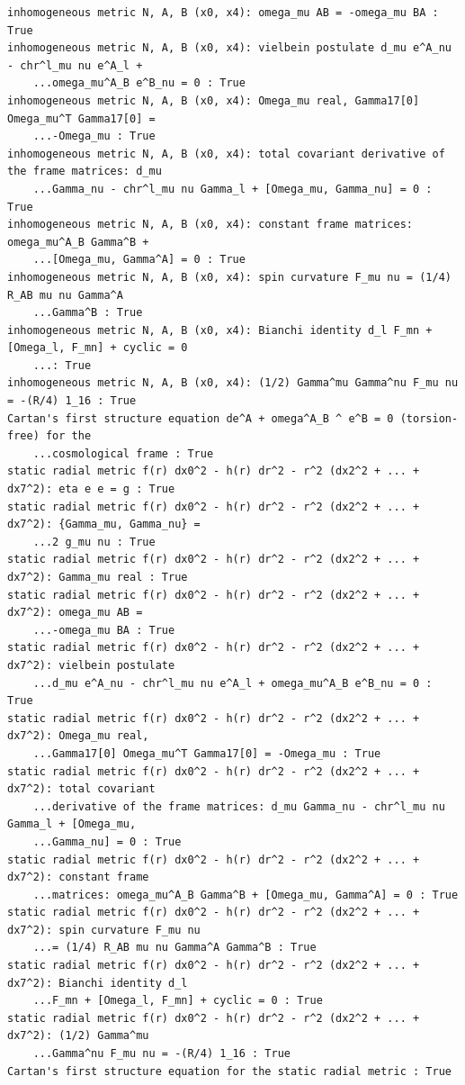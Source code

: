 \documentclass[10pt,a4paper]{article}
\begin{document}
\begin{Verbatim}[fontsize=\small,frame=single,framesep=2mm]
inhomogeneous metric N, A, B (x0, x4): omega_mu AB = -omega_mu BA : True
inhomogeneous metric N, A, B (x0, x4): vielbein postulate d_mu e^A_nu - chr^l_mu nu e^A_l +
    ...omega_mu^A_B e^B_nu = 0 : True
inhomogeneous metric N, A, B (x0, x4): Omega_mu real, Gamma17[0] Omega_mu^T Gamma17[0] =
    ...-Omega_mu : True
inhomogeneous metric N, A, B (x0, x4): total covariant derivative of the frame matrices: d_mu
    ...Gamma_nu - chr^l_mu nu Gamma_l + [Omega_mu, Gamma_nu] = 0 : True
inhomogeneous metric N, A, B (x0, x4): constant frame matrices: omega_mu^A_B Gamma^B +
    ...[Omega_mu, Gamma^A] = 0 : True
inhomogeneous metric N, A, B (x0, x4): spin curvature F_mu nu = (1/4) R_AB mu nu Gamma^A
    ...Gamma^B : True
inhomogeneous metric N, A, B (x0, x4): Bianchi identity d_l F_mn + [Omega_l, F_mn] + cyclic = 0
    ...: True
inhomogeneous metric N, A, B (x0, x4): (1/2) Gamma^mu Gamma^nu F_mu nu = -(R/4) 1_16 : True
Cartan's first structure equation de^A + omega^A_B ^ e^B = 0 (torsion-free) for the
    ...cosmological frame : True
static radial metric f(r) dx0^2 - h(r) dr^2 - r^2 (dx2^2 + ... + dx7^2): eta e e = g : True
static radial metric f(r) dx0^2 - h(r) dr^2 - r^2 (dx2^2 + ... + dx7^2): {Gamma_mu, Gamma_nu} =
    ...2 g_mu nu : True
static radial metric f(r) dx0^2 - h(r) dr^2 - r^2 (dx2^2 + ... + dx7^2): Gamma_mu real : True
static radial metric f(r) dx0^2 - h(r) dr^2 - r^2 (dx2^2 + ... + dx7^2): omega_mu AB =
    ...-omega_mu BA : True
static radial metric f(r) dx0^2 - h(r) dr^2 - r^2 (dx2^2 + ... + dx7^2): vielbein postulate
    ...d_mu e^A_nu - chr^l_mu nu e^A_l + omega_mu^A_B e^B_nu = 0 : True
static radial metric f(r) dx0^2 - h(r) dr^2 - r^2 (dx2^2 + ... + dx7^2): Omega_mu real,
    ...Gamma17[0] Omega_mu^T Gamma17[0] = -Omega_mu : True
static radial metric f(r) dx0^2 - h(r) dr^2 - r^2 (dx2^2 + ... + dx7^2): total covariant
    ...derivative of the frame matrices: d_mu Gamma_nu - chr^l_mu nu Gamma_l + [Omega_mu,
    ...Gamma_nu] = 0 : True
static radial metric f(r) dx0^2 - h(r) dr^2 - r^2 (dx2^2 + ... + dx7^2): constant frame
    ...matrices: omega_mu^A_B Gamma^B + [Omega_mu, Gamma^A] = 0 : True
static radial metric f(r) dx0^2 - h(r) dr^2 - r^2 (dx2^2 + ... + dx7^2): spin curvature F_mu nu
    ...= (1/4) R_AB mu nu Gamma^A Gamma^B : True
static radial metric f(r) dx0^2 - h(r) dr^2 - r^2 (dx2^2 + ... + dx7^2): Bianchi identity d_l
    ...F_mn + [Omega_l, F_mn] + cyclic = 0 : True
static radial metric f(r) dx0^2 - h(r) dr^2 - r^2 (dx2^2 + ... + dx7^2): (1/2) Gamma^mu
    ...Gamma^nu F_mu nu = -(R/4) 1_16 : True
Cartan's first structure equation for the static radial metric : True

\end{Verbatim}
\end{document}
